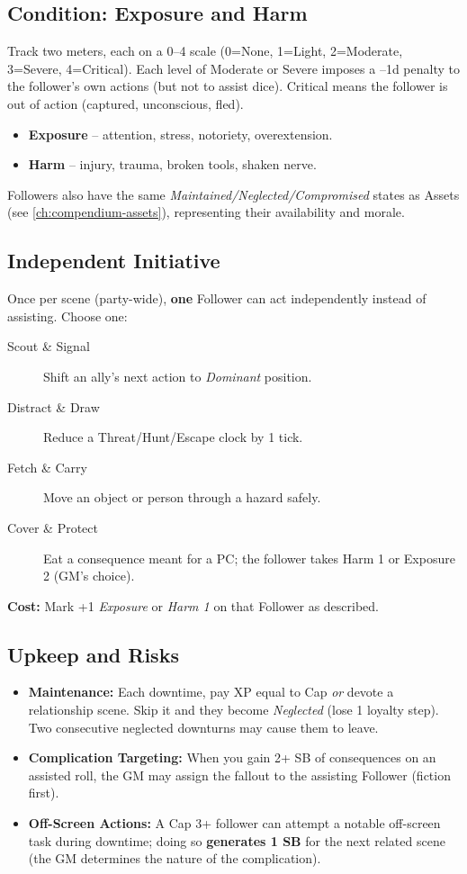 \subsection*{Condition: Exposure and Harm}
Track two meters, each on a 0--4 scale (0=None, 1=Light, 2=Moderate, 3=Severe, 4=Critical). Each level of Moderate or Severe imposes a --1d penalty to the follower's own actions (but not to assist dice). Critical means the follower is out of action (captured, unconscious, fled).
\begin{itemize}
  \item \textbf{Exposure} -- attention, stress, notoriety, overextension.
  \item \textbf{Harm} -- injury, trauma, broken tools, shaken nerve.
\end{itemize}
Followers also have the same \emph{Maintained/Neglected/Compromised} states as Assets (see \ref{ch:compendium-assets}), representing their availability and morale.

\subsection*{Independent Initiative}
Once per scene (party-wide), \textbf{one} Follower can act independently instead of assisting. Choose one:
\begin{description}
  \item[Scout \& Signal] Shift an ally's next action to \emph{Dominant} position.
  \item[Distract \& Draw] Reduce a Threat/Hunt/Escape clock by 1 tick.
  \item[Fetch \& Carry] Move an object or person through a hazard safely.
  \item[Cover \& Protect] Eat a consequence meant for a PC; the follower takes Harm 1 or Exposure 2 (GM's choice).
\end{description}
\textbf{Cost:} Mark +1 \emph{Exposure} or \emph{Harm 1} on that Follower as described.

\subsection*{Upkeep and Risks}
\begin{itemize}
  \item \textbf{Maintenance:} Each downtime, pay XP equal to Cap \emph{or} devote a relationship scene. Skip it and they become \emph{Neglected} (lose 1 loyalty step). Two consecutive neglected downturns may cause them to leave.
  \item \textbf{Complication Targeting:} When you gain 2+ SB of consequences on an assisted roll, the GM may assign the fallout to the assisting Follower (fiction first).
  \item \textbf{Off-Screen Actions:} A Cap 3+ follower can attempt a notable off-screen task during downtime; doing so \textbf{generates 1 SB} for the next related scene (the GM determines the nature of the complication).
\end{itemize}

